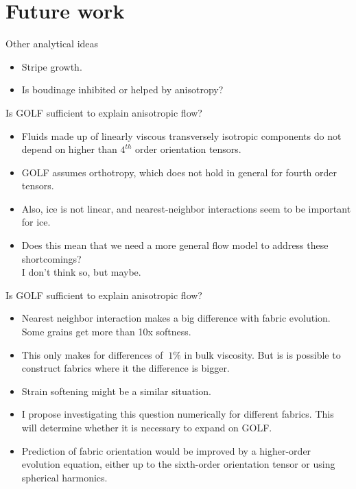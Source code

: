 \documentclass{beamer}
\begin{document}
\section{Future work}

\begin{frame}{Other analytical ideas}
   \begin{itemize}
      \item Stripe growth.
      \item Is boudinage inhibited or helped by anisotropy?
      
   \end{itemize}
\end{frame}


\begin{frame}{Is GOLF sufficient to explain anisotropic flow?}
   \begin{itemize}
      \item Fluids made up of linearly viscous transversely isotropic components do not depend on higher than $4^{th}$ order orientation tensors.
      \item GOLF assumes orthotropy, which does not hold in general for fourth order tensors.
      \item Also, ice is not linear, and nearest-neighbor interactions seem to be important for ice.
      \item Does this mean that we need a more general flow model to address these shortcomings? \\
         \pause I don't think so, but maybe.
   \end{itemize}
\end{frame}
\begin{frame}{Is GOLF sufficient to explain anisotropic flow?}
   \begin{itemize}
      \item Nearest neighbor interaction makes a big difference with fabric evolution. Some grains get more than 10x softness.
      \item This only makes for differences of $~1\%$ in bulk viscosity. But is is possible to construct fabrics where it the difference is bigger.
      \item Strain softening might be a similar situation.
      \item I propose investigating this question numerically for different fabrics. This will determine whether it is necessary to expand on GOLF.
      \item Prediction of fabric orientation would be improved by a higher-order evolution equation, either up to the sixth-order orientation tensor or using spherical harmonics.
   \end{itemize}
\end{frame}
\end{document}
